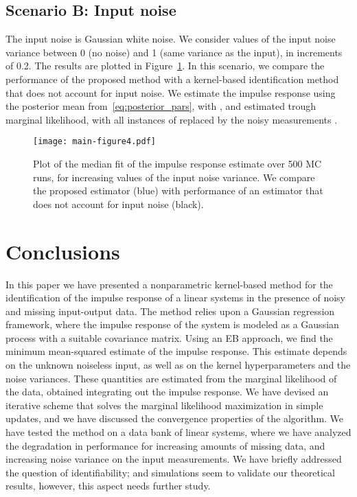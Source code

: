 \documentclass[10pt]{article}
\begin{document}
\subsection*{Scenario B\@: Input noise}
The input noise is Gaussian white noise. We consider values of the input noise
variance between 0 (no noise) and 1 (same variance as the input), in increments
of 0.2. The results are plotted in Figure~\ref{fig:scenario_b}. In this
scenario, we compare the performance of the proposed method with a kernel-based
identification method that does not account for input noise. We estimate the
impulse response using the posterior mean  from~\eqref{eq:posterior_pars},
with ,  and  estimated trough marginal likelihood,
with all instances of  replaced by the noisy measurements .
\begin{figure}[htb]
  \centering
  \texttt{[image: main-figure4.pdf]}
  \caption{Plot of the median fit of the impulse response estimate over 500 MC
    runs, for increasing values of the input noise variance. We compare the
    proposed estimator (blue) with performance of an estimator that does not
  account for input noise (black).}\label{fig:scenario_b}
\end{figure}

\section{Conclusions}\label{sec:conclusions}
In this paper we have presented a nonparametric kernel-based method for the
identification of
the impulse response of a linear systems in the presence of noisy and missing input-output
data. The method relies upon a Gaussian regression framework,
where the impulse response of the system is modeled as a Gaussian process with
a suitable covariance matrix. Using an EB approach, we find the minimum
mean-squared estimate of the impulse response. This estimate depends on the
unknown noiseless input, as well as on the kernel hyperparameters and the noise
variances. These quantities are estimated from the marginal likelihood of the data, obtained
integrating out the impulse response. We have devised an iterative scheme that
solves the marginal likelihood maximization in simple updates, and we have discussed
the convergence properties of the algorithm. We have tested the method on a data
bank of linear systems, where we have analyzed the degradation in performance
for increasing amounts of missing data, and increasing noise variance on the input
measurements. We have briefly addressed the question of identifiability; and
simulations seem to validate our theoretical results, however, this aspect
needs further study.



\end{document}
